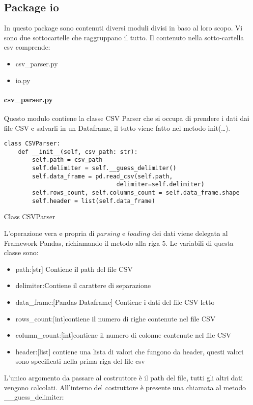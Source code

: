 \subsection{Package io}
In questo package sono contenuti diversi moduli divisi in baso al loro scopo. Vi sono due sottocartelle che raggruppano il tutto.
Il contenuto nella sotto-cartella csv comprende:
\begin{itemize}[noitemsep]
\let\labelitemi\labelitemii
    \item csv{\_}parser.py
    \item io.py
\end{itemize}

\paragraph{csv{\_}parser.py}
Questo modulo contiene la classe CSV Parser che si occupa di prendere i dati dai file CSV e salvarli in un Dataframe, il tutto viene fatto nel metodo init(\ldots).
\begin{listing}[H]
\begin{verbatim}
class CSVParser:
    def __init__(self, csv_path: str):
        self.path = csv_path
        self.delimiter = self.__guess_delimiter()
        self.data_frame = pd.read_csv(self.path, 
                                delimiter=self.delimiter)
        self.rows_count, self.columns_count = self.data_frame.shape
        self.header = list(self.data_frame)
\end{verbatim}
\caption{Class CSVParser}
\label{Code:1}
\end{listing}
L'operazione vera e propria di $parsing$ e $loading$ dei dati viene delegata al Framework Pandas, richiamando il metodo alla riga 5.
Le variabili di questa classe sono:
\begin{itemize}[noitemsep]
\let\labelitemi\labelitemii
    \item path:[str] Contiene il path del file CSV
    \item delimiter:Contiene il carattere di separazione
    \item data{\_}frame:[Pandas Dataframe] Contiene i dati del file CSV letto
    \item rows{\_}count:[int]contiene il numero di righe contenute nel file CSV
    \item column{\_}count:[int]contiene il numero di colonne contenute nel file CSV
    \item header:[list] contiene una lista di valori che fungono da header, questi valori sono specificati nella prima riga del file csv
\end{itemize}
L'unico argomento da passare al costruttore è il path del file, tutti gli altri dati vengono calcolati. 
All'interno del costruttore è presente una chiamata al metodo {\_\_}guess{\_}delimiter:

